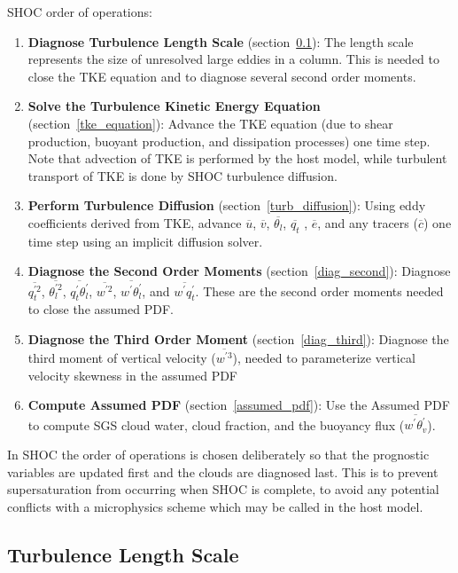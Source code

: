 SHOC order of operations:
\begin{enumerate}
  \item \textbf{Diagnose Turbulence Length Scale} (section~\ref{turb_scale}): The length scale represents the size of unresolved large eddies in a column.  This is needed to close the TKE equation and to diagnose several second order moments.
  \item \textbf{Solve the Turbulence Kinetic Energy Equation} (section~\ref{tke_equation}): Advance the TKE equation (due to shear production, buoyant production, and dissipation processes) one time step.  Note that advection of TKE is performed by the host model, while turbulent transport of TKE is done by SHOC turbulence diffusion.    
  \item \textbf{Perform Turbulence Diffusion} (section~\ref{turb_diffusion}): Using eddy coefficients derived from TKE, advance $\overline{u}$, $\overline{v}$, $\overline{\theta_{l}}$, $\overline{q_{t}}$ , $\overline{e}$, and any tracers ($\overline{c}$) one time step using an implicit diffusion solver.  
  \item \textbf{Diagnose the Second Order Moments} (section~\ref{diag_second}): Diagnose $\overline{q_{t}^{'2}}$, $\overline{\theta_{l}^{'2}}$, $\overline{q_{t}^{'}\theta_{l}^{'}}$, $\overline{w^{'2}}$, $\overline{w^{'}\theta_{l}^{'}}$, and $\overline{w^{'}q_{t}^{'}}$.  These are the second order moments needed to close the assumed PDF.
  \item \textbf{Diagnose the Third Order Moment} (section~\ref{diag_third}):  Diagnose the third moment of vertical velocity ($\overline{w^{'3}}$), needed to parameterize vertical velocity skewness in the assumed PDF
  \item \textbf{Compute Assumed PDF} (section~\ref{assumed_pdf}): Use the Assumed PDF to compute SGS cloud water, cloud fraction, and the buoyancy flux ($\overline{w^{'}\theta_{v}^{'}}$).
\end{enumerate}

In SHOC the order of operations is chosen deliberately so that the prognostic variables are updated first and the clouds are diagnosed last.  This is to prevent supersaturation from occurring when SHOC is complete, to avoid any potential conflicts with a microphysics scheme which may be called in the host model. 

\subsection{Turbulence Length Scale}
\label{turb_scale}

